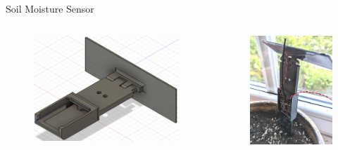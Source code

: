 \documentclass{beamer}
\begin{document}
\begin{frame}{Soil Moisture Sensor}
\begin{columns}[T]
\begin{column}{.5\textwidth}
    \begin{figure}
        \centering
        \includegraphics[width=\linewidth]{../thesis/img/sensor-case.png}
    \end{figure}
\end{column}
\hfil
\begin{column}{.5\textwidth}
    \begin{figure}
        \centering
        \includegraphics[width=\linewidth]{../thesis/img/sensor-deploy-close.jpg}

\end{figure}
\end{column}
\end{columns}
\end{frame}
\end{document}
